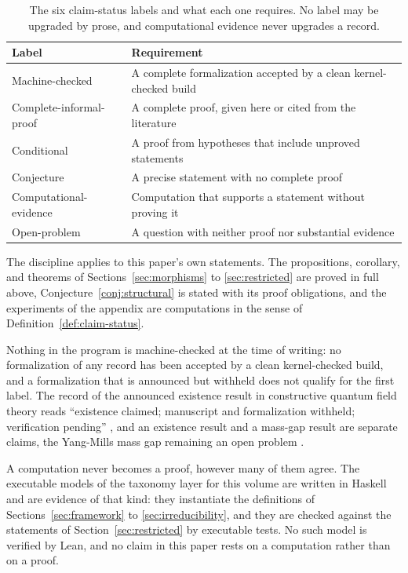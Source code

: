 \documentclass[11pt,letterpaper]{article}
\theoremstyle{definition}
\theoremstyle{remark}
\begin{document}
\begin{table}[ht]
\centering
\small
\caption{The six claim-status labels and what each one requires. No label may be upgraded by prose, and computational evidence never upgrades a record.}
\label{tab:claims}
\begin{tabularx}{\textwidth}{L{0.24\textwidth} X}
\toprule
Label & Requirement \\
\midrule
Machine-checked & A complete formalization accepted by a clean kernel-checked build \\
Complete-informal-proof & A complete proof, given here or cited from the literature \\
Conditional & A proof from hypotheses that include unproved statements \\
Conjecture & A precise statement with no complete proof \\
Computational-evidence & Computation that supports a statement without proving it \\
Open-problem & A question with neither proof nor substantial evidence \\
\bottomrule
\end{tabularx}
\end{table}

The discipline applies to this paper's own statements. The propositions, corollary, and theorems of Sections~\ref{sec:morphisms} to \ref{sec:restricted} are proved in full above, Conjecture~\ref{conj:structural} is stated with its proof obligations, and the experiments of the appendix are computations in the sense of Definition~\ref{def:claim-status}.

Nothing in the program is machine-checked at the time of writing: no formalization of any record has been accepted by a clean kernel-checked build, and a formalization that is announced but withheld does not qualify for the first label. The record of the announced existence result in constructive quantum field theory reads ``existence claimed; manuscript and formalization withheld; verification pending'' \cite{openai-claim,kitp}, and an existence result and a mass-gap result are separate claims, the Yang-Mills mass gap remaining an open problem \cite{clay}.

A computation never becomes a proof, however many of them agree. The executable models of the taxonomy layer for this volume are written in Haskell and are evidence of that kind: they instantiate the definitions of Sections~\ref{sec:framework} to \ref{sec:irreducibility}, and they are checked against the statements of Section~\ref{sec:restricted} by executable tests. No such model is verified by Lean, and no claim in this paper rests on a computation rather than on a proof.
\end{document}
